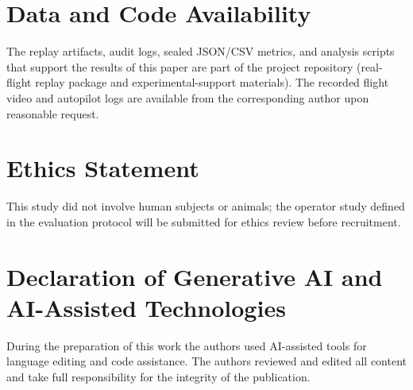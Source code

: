 \documentclass[fleqn]{VRIH2025}
\begin{document}
\section*{Data and Code Availability}

The replay artifacts, audit logs, sealed JSON/CSV metrics, and analysis scripts that support the results of this paper are part of the project repository (real-flight replay package and experimental-support materials). The recorded flight video and autopilot logs are available from the corresponding author upon reasonable request.

\section*{Ethics Statement}

This study did not involve human subjects or animals; the operator study defined in the evaluation protocol will be submitted for ethics review before recruitment.

\section*{Declaration of Generative AI and AI-Assisted Technologies}

During the preparation of this work the authors used AI-assisted tools for language editing and code assistance. The authors reviewed and edited all content and take full responsibility for the integrity of the publication.
\end{document}
